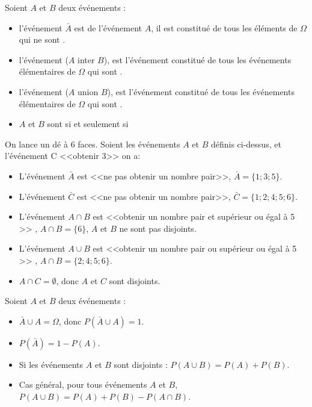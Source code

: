 \documentclass[12pt,a4paper]{article}
\begin{document}
\begin{mydef}
	Soient $A$ et $B$ deux événements : 
	\begin{itemize}
		
		\item l'événement $\bar{A}$ est  de l'événement $A$, il est constitué de tous les éléments de $\Omega$ qui ne sont .
		
		\item l'événement  ($A$ inter $B$), est l'événement constitué de tous les événements élémentaires de $\Omega$ qui sont .
		
		\item l'événement  ($A$ union $B$), est l'événement constitué de tous les événements élémentaires de $\Omega$ qui sont .
		
		\item $A$ et $B$ sont  si et seulement si 
	\end{itemize} 
\end{mydef}

\begin{myexs}
	On lance un dé à 6 faces. Soient les événements $A$ et $B$ définis ci-dessus, et l'événement C <<obtenir 3>> on a:
	\begin{itemize}
		\item L'événement $\bar{A}$ est <<ne pas obtenir un nombre pair>>, $\bar{A}=\{1;3;5\}$.
		\item L'événement $\bar{C}$ est <<ne pas obtenir un nombre pair>>, $\bar{C}=\{1;2;4;5;6\}$.
		\item L'événement $A\cap B$ est <<obtenir un nombre pair et supérieur ou égal à 5 >> , $A\cap B = \{6\}$, $A$ et $B$ ne sont pas disjoints.
		\item L'événement $A\cup B$ est <<obtenir un nombre pair ou supérieur ou égal à 5 >> , $A\cap B = \{2;4;5;6\}$.
		\item $A \cap C = \emptyset$, donc $A$ et $C$ sont disjoints.
	\end{itemize}
	
\end{myexs}

\begin{mybilan}
	Soient $A$ et $B$ deux événements : 
	\begin{itemize}
		\item $\bar{A} \cup A = \Omega$, donc $P(\bar{A} \cup A)=1$.
		\item $P(\bar{A}) = 1 - P(A)$.
		\item Si les événements $A$ et $B$ sont disjoints : $P(A \cup B) = P(A) + P(B)$.
		\item Cas général, pour tous événements $A$ et $B$, \\ $P(A \cup B) = P(A) + P(B) - P(A \cap B)$.
	\end{itemize}
\end{mybilan}
\end{document}

